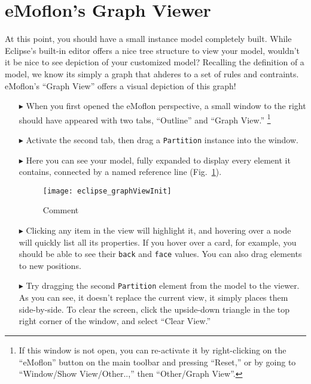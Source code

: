 \newpage
\section{eMoflon's Graph Viewer}
\genHeader
\hypertarget{sec:Graph View}{}

At this point, you should have a small instance model completely built. While Eclipse's built-in editor offers a nice tree structure to view your model,
wouldn't it be nice to see depiction of your customized model? Recalling the definition of a model, we know its simply a graph that ahderes to a set of rules
and contraints. eMoflon's ``Graph View'' offers a visual depiction of this graph!

\begin{itemize}

\item[$\blacktriangleright$] When you first opened the eMoflon perspective, a small window to the right should have appeared with two tabs, ``Outline'' and
``Graph View.'' \footnote{If this window is not open, you can re-activate it by right-clicking on the ``eMoflon'' button on the main toolbar and pressing
``Reset,'' or by going to ``Window/Show View/Other..,'' then ``Other/Graph View''.} 

\item[$\blacktriangleright$] Activate the second tab, then drag a \texttt{Partition} instance into the window. 

\item[$\blacktriangleright$] Here you can see your model, fully expanded to display every element it contains, connected by a named reference line
(Fig.~\ref{fig:graphView_init}).

\begin{figure}[htbp]
	\centering
  \texttt{[image: eclipse\_graphViewInit]}
	\caption{Comment}
	\label{fig:graphView_init}
\end{figure}

\item[$\blacktriangleright$] Clicking any item in the view will highlight it, and hovering over a node will quickly list all its properties. If you hover
over a card, for example, you should be able to see their \texttt{back} and \texttt{face} values. You can also drag elements to new positions.

\item[$\blacktriangleright$] Try dragging the second \texttt{Partition} element from the model to the viewer. As you can see, it doesn't replace the current
view, it simply places them side-by-side. To clear the screen, click the upside-down triangle in the top right corner of the window, and select ``Clear View.''


\end{itemize}
